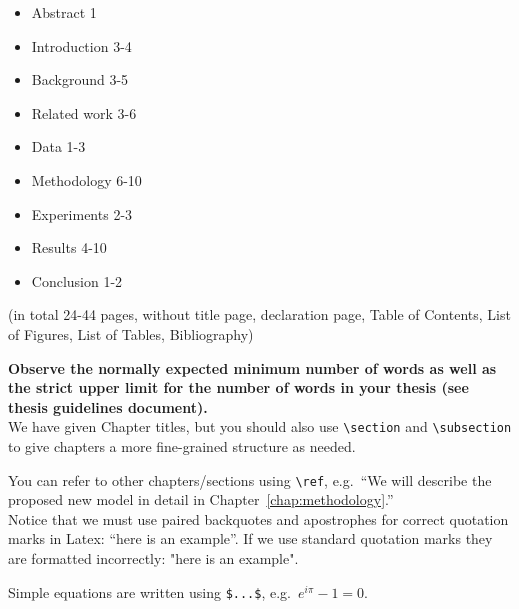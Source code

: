 \documentclass[a4paper,12pt]{Classes/RoboticsLaTeX}
\begin{document}
	\begin{itemize}
		\item Abstract 1 
		\item Introduction 3-4
		\item Background 3-5
		\item Related work 3-6
		\item Data 1-3
		\item Methodology 6-10
		\item Experiments 2-3
		\item Results 4-10
		\item Conclusion 1-2
	\end{itemize}
	
	(in total 24-44 pages, without title page, declaration page, Table of Contents, List of Figures, List of Tables, Bibliography)
	
	\textbf{Observe the normally expected minimum number of words as well as the strict upper limit for the number of words in your thesis (see thesis guidelines document).}\\
	
	We have given Chapter titles, but you should also use \verb+\section+ and \verb+\subsection+ to give chapters a more fine-grained structure as needed.
	
	You can refer to other chapters/sections using \verb+\ref+, e.g.~``We will describe the proposed new model in detail in Chapter~\ref{chap:methodology}.''\\
	
	Notice that we must use paired backquotes and apostrophes for correct quotation marks in Latex: ``here is an example''. If we use standard quotation marks they are formatted incorrectly: "here is an example".
	
	Simple equations are written using \verb+$...$+, e.g.~$e^{i\pi} - 1 = 0$.\\
	
\end{document}

